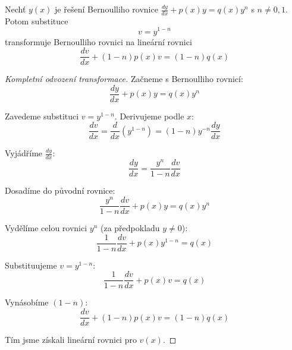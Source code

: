 \begin{theorem}
\label{th:transformace-bernoulli}
Nechť $y(x)$ je řešení Bernoulliho rovnice $\frac{dy}{dx} + p(x)y = q(x)y^n$ s $n \neq 0, 1$. Potom substituce
\[
v = y^{1-n}
\]
transformuje Bernoulliho rovnici na lineární rovnici
\[
\frac{dv}{dx} + (1-n)p(x)v = (1-n)q(x)
\]
\end{theorem}

\vspace{0.6\baselineskip}

\begin{proof}[Kompletní odvození transformace]
\label{proof:transformace-odvozeni}
Začneme s Bernoulliho rovnicí:
\[
\frac{dy}{dx} + p(x)y = q(x)y^n
\]

Zavedeme substituci $v = y^{1-n}$. Derivujeme podle $x$:
\[
\frac{dv}{dx} = \frac{d}{dx}(y^{1-n}) = (1-n)y^{-n}\frac{dy}{dx}
\]

Vyjádříme $\frac{dy}{dx}$:
\[
\frac{dy}{dx} = \frac{y^n}{1-n}\frac{dv}{dx}
\]

Dosadíme do původní rovnice:
\[
\frac{y^n}{1-n}\frac{dv}{dx} + p(x)y = q(x)y^n
\]

Vydělíme celou rovnici $y^n$ (za předpokladu $y \neq 0$):
\[
\frac{1}{1-n}\frac{dv}{dx} + p(x)y^{1-n} = q(x)
\]

Substituujeme $v = y^{1-n}$:
\[
\frac{1}{1-n}\frac{dv}{dx} + p(x)v = q(x)
\]

Vynásobíme $(1-n)$:
\[
\frac{dv}{dx} + (1-n)p(x)v = (1-n)q(x)
\]

Tím jsme získali lineární rovnici pro $v(x)$.
\end{proof}

\vspace{0.8\baselineskip}

